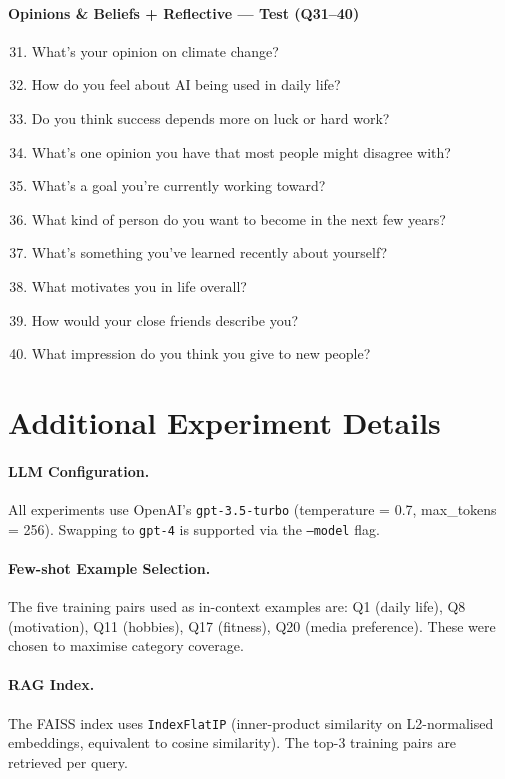 \documentclass[11pt]{article}
\begin{document}
\paragraph{Opinions \& Beliefs + Reflective — Test (Q31--40)}
\begin{enumerate}\setcounter{enumi}{30}
  \item What's your opinion on climate change?
  \item How do you feel about AI being used in daily life?
  \item Do you think success depends more on luck or hard work?
  \item What's one opinion you have that most people might disagree with?
  \item What's a goal you're currently working toward?
  \item What kind of person do you want to become in the next few years?
  \item What's something you've learned recently about yourself?
  \item What motivates you in life overall?
  \item How would your close friends describe you?
  \item What impression do you think you give to new people?
\end{enumerate}

\section{Additional Experiment Details}
\label{app:details}

\paragraph{LLM Configuration.}
All experiments use OpenAI's \texttt{gpt-3.5-turbo} (temperature = 0.7,
max\_tokens = 256).
Swapping to \texttt{gpt-4} is supported via the \texttt{--model} flag.

\paragraph{Few-shot Example Selection.}
The five training pairs used as in-context examples are:
Q1 (daily life), Q8 (motivation), Q11 (hobbies), Q17 (fitness), Q20
(media preference).
These were chosen to maximise category coverage.

\paragraph{RAG Index.}
The FAISS index uses \texttt{IndexFlatIP} (inner-product similarity on
L2-normalised embeddings, equivalent to cosine similarity).
The top-3 training pairs are retrieved per query.
\end{document}
